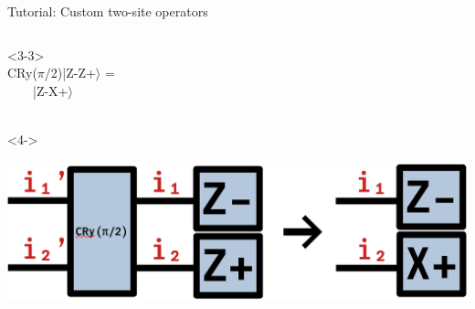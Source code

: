 \begin{frame}[fragile]{Tutorial: Custom two-site operators}
\begin{columns}
\begin{column}{4.5cm}
\begin{onlyenv}<3-3>
~\\
CRy($\pi$/2)|Z-Z+$\rangle$ =\\
\ \ \ \ |Z-X+$\rangle$ \\
~\\
\end{onlyenv}

\begin{onlyenv}<4->
\vspace*{0.0cm}
\begin{center}
\includegraphics[width=1.0\textwidth]{
  slides/assets/CRyZm1Zp2_to_Zm1Xp2.png
}
\end{center}
\vspace*{0.0cm}
\end{onlyenv}

\end{column}

\end{columns}

\end{frame}

